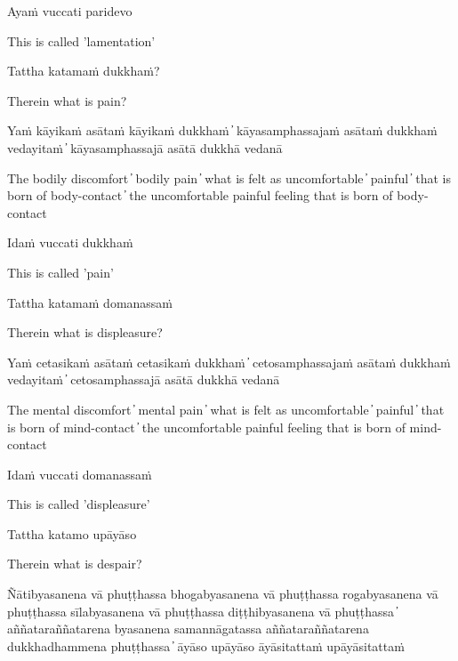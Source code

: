 Ayaṁ vuccati paridevo

\begin{cprenglish}
This is called 'lamentation'
\end{cprenglish}

Tattha katamaṁ dukkhaṁ?

\begin{cprenglish}
Therein what is pain?
\end{cprenglish}

Yaṁ kāyikaṁ asātaṁ kāyikaṁ dukkhaṁ  ̓  kāyasamphassajaṁ asātaṁ dukkhaṁ vedayitaṁ  ̓  kāyasamphassajā asātā dukkhā vedanā

\begin{cprenglish}
The bodily discomfort  ̓  bodily pain  ̓  what is felt as uncomfortable  ̓  painful  ̓  that is born of body-contact  ̓  the uncomfortable painful feeling that is born of body-contact
\end{cprenglish}

Idaṁ vuccati dukkhaṁ

\begin{cprenglish}
This is called 'pain'
\end{cprenglish}

Tattha katamaṁ domanassaṁ

\begin{cprenglish}
Therein what is displeasure?
\end{cprenglish}

Yaṁ cetasikaṁ asātaṁ cetasikaṁ dukkhaṁ  ̓  cetosamphassajaṁ asātaṁ dukkhaṁ vedayitaṁ  ̓  cetosamphassajā asātā dukkhā vedanā

\begin{cprenglish}
The mental discomfort  ̓  mental pain  ̓  what is felt as uncomfortable  ̓  painful  ̓  that is born of mind-contact  ̓  the uncomfortable painful feeling that is born of mind-contact
\end{cprenglish}

Idaṁ vuccati domanassaṁ

\begin{cprenglish}
This is called 'displeasure'
\end{cprenglish}

Tattha katamo upāyāso

\begin{cprenglish}
Therein what is despair?
\end{cprenglish}

Ñātibyasanena vā phuṭṭhassa bhogabyasanena vā phuṭṭhassa rogabyasanena vā phuṭṭhassa sīlabyasanena vā phuṭṭhassa diṭṭhibyasanena vā phuṭṭhassa  ̓  aññataraññatarena byasanena samannāgatassa aññataraññatarena dukkhadhammena phuṭṭhassa  ̓  āyāso upāyāso āyāsitattaṁ upāyāsitattaṁ

